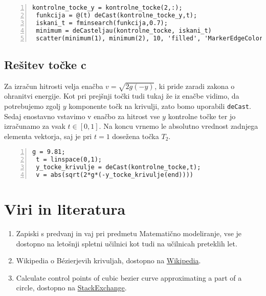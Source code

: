 \documentclass[a4paper,12pt]{article}
\begin{document}
	\begin{lstlisting}[style=Matlab-editor,	numbers=left,]
 kontrolne_tocke_y = kontrolne_tocke(2,:);
 funkcija = @(t) deCast(kontrolne_tocke_y,t);
 iskani_t = fminsearch(funkcija,0.7);
 minimum = deCasteljau(kontrolne_tocke, iskani_t)
 scatter(minimum(1), minimum(2), 10, 'filled', 'MarkerEdgeColor', 'k', 'MarkerFaceColor', 'g')
	\end{lstlisting}
	
	\subsection{Rešitev točke c}
	
	Za izračun hitrosti velja enačba $v = \sqrt{2g(-y)}$, ki pride zaradi zakona o ohranitvi energije. 
	Kot pri prejšnji točki tudi tukaj že iz enačbe vidimo, da potrebujemo zgolj $y$ komponente točk na krivulji, zato bomo
	uporabili \lstinline[style=Matlab-editor]!deCast!. Sedaj enostavno vstavimo v enačbo za hitrost vse $y$ kontrolne točke ter
	jo izračunamo za vsak $t \in [0,1]$. Na koncu vrnemo le absolutno vrednost zadnjega elementa vektorja, saj je pri $t = 1$ dosežena točka $T_2$.

	\begin{lstlisting}[style=Matlab-editor,	numbers=left,]
 g = 9.81;
 t = linspace(0,1);
 y_tocke_krivulje = deCast(kontrolne_tocke,t);
 v = abs(sqrt(2*g*(-y_tocke_krivulje(end))))
	\end{lstlisting}
	

	\section{Viri in literatura}
	
	\begin{enumerate}[label=\textbullet]
		\item Zapiski s predvanj in vaj pri predmetu Matematično modeliranje, vse je dostopno na letošnji spletni učilnici kot tudi na učilnicah preteklih let.
		\item Wikipedia o B\'{e}zierjevih krivuljah, dostopno na \href{https://sl.wikipedia.org/wiki/Bézierova_krivulja}{Wikipedia}.
		\item Calculate control points of cubic bezier curve approximating a part of a circle, dostopno na \href{https://math.stackexchange.com/questions/873224/calculate-control-points-of-cubic-bezier-curve-approximating-a-part-of-a-circle}{StackExchange}.
	\end{enumerate}
	
\end{document}
